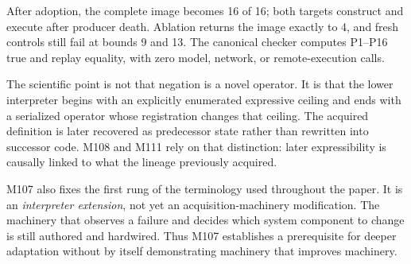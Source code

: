 After adoption, the complete image becomes 16 of 16; both targets construct and execute after producer death. Ablation returns the image exactly to 4, and fresh controls still fail at bounds 9 and 13. The canonical checker computes P1--P16 true and replay equality, with zero model, network, or remote-execution calls.

The scientific point is not that negation is a novel operator. It is that the lower interpreter begins with an explicitly enumerated expressive ceiling and ends with a serialized operator whose registration changes that ceiling. The acquired definition is later recovered as predecessor state rather than rewritten into successor code. M108 and M111 rely on that distinction: later expressibility is causally linked to what the lineage previously acquired.

M107 also fixes the first rung of the terminology used throughout the paper. It is an \emph{interpreter extension}, not yet an acquisition-machinery modification. The machinery that observes a failure and decides which system component to change is still authored and hardwired. Thus M107 establishes a prerequisite for deeper adaptation without by itself demonstrating machinery that improves machinery.

